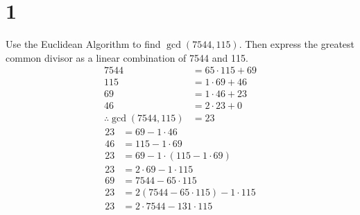 \documentclass{article}
\begin{document}
\newcommand{\hr}{\par\noindent\rule{\textwidth}{0.4pt}}

\newcommand{\bc}[1]{
	\begin{equation*}
		\begin{boxed}
			{#1}
		\end{boxed}
	\end{equation*}
}

\newcommand{\cond}[2]{
	\ifmmode
	{#1} \quad {#2}
	\else
	$$ {#1} \quad {#2} $$
	\fi
}

\newcommand{\matr}[1]{
	\ifmmode \bm{#1}
	\else \textit{\textbf{#1}}
	\fi
}
\newcommand{\vect}[1]{
	\ifmmode \mathbf{#1}
	\else \textbf{#1}
	\fi
}


\newcommand{\modulus}[1]{\mathrm{mod}\ #1}

\tableofcontents

\section{1}

Use the Euclidean Algorithm to find $ \gcd(7544, 115) $. Then express the greatest common divisor as a linear combination of 7544 and 115.
\begin{align*}
	7544                       & = 65 \cdot 115 + 69 \\
	115                        & = 1 \cdot 69 + 46   \\
	69                         & = 1 \cdot 46 + 23   \\
	46                         & = 2 \cdot 23 + 0    \\
	\therefore \gcd(7544, 115) & = 23
\end{align*}
\begin{align*}
	23 & = 69 - 1 \cdot 46                      \\
	46 & = 115 - 1 \cdot 69                     \\
	23 & = 69 - 1 \cdot (115 - 1 \cdot 69)      \\
	23 & = 2 \cdot 69 - 1 \cdot 115             \\
	69 & = 7544 - 65 \cdot 115                  \\
	23 & = 2(7544 - 65 \cdot 115) - 1 \cdot 115 \\
	23 & = 2 \cdot 7544 - 131 \cdot 115
\end{align*}
\end{document}
